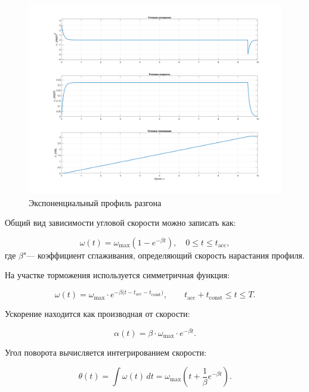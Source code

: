 \begin{figure}[h!]
	\centering
	\includegraphics[scale=0.4]{matlab/img/exp-profile.png}
	\caption{Экспоненциальный профиль разгона}
	\label{fig:exp_profile}
\end{figure}



Общий вид зависимости угловой скорости можно записать как:

\begin{equation}
	\label{eq:exp_speed}
	\omega(t) = \omega_{\max}\left(1 - e^{-\beta t}\right), \quad 0 \leq t \leq t_{\mathrm{acc}},
\end{equation}
где \(\beta\)"--- коэффициент сглаживания, определяющий скорость нарастания профиля. 

На участке торможения используется симметричная функция:

\begin{equation}
	\label{eq:omega_exp}
	\omega(t) = \omega_{\max} \cdot e^{-\beta \bigl(t - t_{\mathrm{acc}} - t_{\mathrm{const}}\bigr)}, 
	\qquad t_{\mathrm{acc}} + t_{\mathrm{const}} \leq t \leq T.
\end{equation}

Ускорение находится как производная от скорости:

\begin{equation}
	\label{eq:alpha_exp}
	\alpha(t) = \beta \cdot \omega_{\max} \cdot e^{-\beta t}.
\end{equation}

Угол поворота вычисляется интегрированием скорости:

\begin{equation}
	\label{eq:theta_exp}
	\theta(t) = \int \omega(t)\, dt 
	= \omega_{\max} \left( t + \frac{1}{\beta} e^{-\beta t} \right).
\end{equation}




